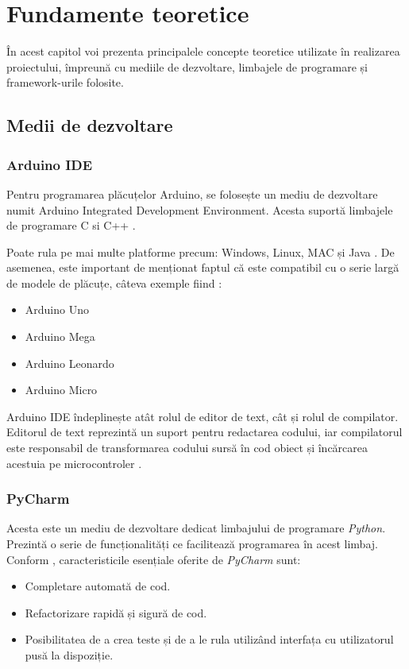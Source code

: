 \chapter{Fundamente teoretice}\label{ch:3fundamenteTeoretice}

	În acest capitol voi prezenta principalele concepte teoretice utilizate în realizarea proiectului, împreună cu mediile de dezvoltare, limbajele de programare și framework-urile folosite. 

\section{Medii de dezvoltare}

\subsection{Arduino IDE}

	Pentru programarea plăcuțelor Arduino, se folosește un mediu de dezvoltare numit Arduino Integrated Development Environment. Acesta suportă limbajele de programare C si C++ \cite{arduinoIDE}. 

	Poate rula pe mai multe platforme precum: Windows, Linux, MAC și Java \cite{arduinoIDE}. De asemenea, este important de menționat faptul că este compatibil cu o serie largă de modele de plăcuțe, câteva exemple fiind \cite{arduinoIDE}:
		\begin{itemize}
			\setlength{\itemindent}{2em}
			\itemsep0em
			\item Arduino Uno
			\item Arduino Mega
			\item Arduino Leonardo
			\item Arduino Micro
		\end{itemize} 

	Arduino IDE îndeplinește atât rolul de editor de text, cât și rolul de compilator. Editorul de text reprezintă un suport pentru redactarea codului, iar compilatorul este responsabil de transformarea codului sursă în cod obiect și încărcarea acestuia pe microcontroler \cite{arduinoIDE}.

\subsection{PyCharm}

	Acesta este un mediu de dezvoltare dedicat limbajului de programare \textit{Python}. Prezintă o serie de funcționalități ce facilitează programarea în acest limbaj. Conform \cite{pyCharm}, caracteristicile esențiale oferite de \textit{PyCharm} sunt:
	\begin{itemize}
		\setlength{\itemindent}{2em}
		\itemsep0em
		\item Completare automată de cod.
		\item Refactorizare rapidă și sigură de cod.
		\item Posibilitatea de a crea teste și de a le rula utilizând interfața cu utilizatorul pusă la dispoziție. 
	\end{itemize}
	
